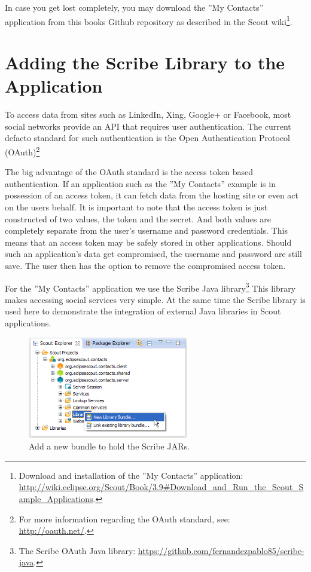 \documentclass[a4paper,10pt,twoside]{book}
\begin{document}
In case you get lost completely, you may download the ''My Contacts'' application from this books Github repository as described in the Scout wiki\footnote{
Download and installation of the ''My Contacts'' application: \url{http://wiki.eclipse.org/Scout/Book/3.9\#Download_and_Run_the_Scout_Sample_Applications}.
}.

\section{Adding the Scribe Library to the Application}

To access data from sites such as LinkedIn, Xing, Google+ or Facebook, most social networks provide an API that requires user authentication. 
The current defacto standard for such authentication is the Open Authentication Protocol (OAuth)\footnote{
For more information regarding the OAuth standard, see: \url{http://oauth.net/}.
} 

The big advantage of the OAuth standard is the access token based authentication. 
If an application such as the ''My Contacts'' example is in possession of an access token, it can fetch data from the hosting site or even act on the users behalf. 
It is important to note that the access token is just constructed of two values, the token and the secret.
And both values are completely separate from the user's username and password credentials. 
This means that an access token may be safely stored in other applications. 
Should such an application's data get compromised, the username and password are still save.
The user then has the option to remove the compromised access token.  

For the ''My Contacts'' application we use the Scribe Java library\footnote{
The Scribe OAuth Java library: \url{https://github.com/fernandezpablo85/scribe-java}.
}
This library makes accessing social services very simple.
At the same time the Scribe library is used here to demonstrate the integration of external Java libraries in Scout applications. 

\begin{figure}
\includegraphics[width=7cm]{new_library_scribe_contextmenu.png} \hspace{5mm}
\caption{Add a new bundle to hold the Scribe JARs.}
\end{figure}
\end{document}
